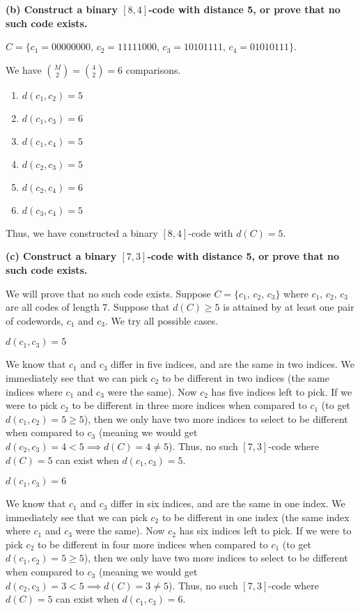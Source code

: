 \textbf{(b) Construct a binary $[8,4]$-code with distance 5, or prove that no such
code exists.}

$ C=\{
    c_1=00000000,\,
    c_2=11111000,\,
    c_3=10101111,\,
    c_4=01010111
    \} $.

We have $ \binom{M}{2}=\binom{4}{2}=6 $ comparisons.
\begin{enumerate}
    \item $ d(c_1,c_2)=5 $
    \item $ d(c_1,c_3)=6 $
    \item $ d(c_1,c_4)=5 $
    \item $ d(c_2,c_3)=5 $
    \item $ d(c_2,c_4)=6 $
    \item $ d(c_3,c_4)=5 $
\end{enumerate}

Thus, we have constructed a binary $ [8,4] $-code with $ d(C)=5 $.

\textbf{(c) Construct a binary $[7,3]$-code with distance 5, or prove that no such
code exists.}

We will prove that no such code exists. Suppose $ C=\{c_1,\,c_2,\,c_3\} $
where $ c_1,\,c_2,\,c_3 $ are all codes of length $ 7 $. Suppose
that $ d(C)\ge 5 $ is attained by at least one pair of codewords,
$ c_1 $ and $ c_3 $. We try all possible cases.

 $ d(c_1,c_3)=5 $

We know that $ c_1 $ and $ c_3 $ differ in five indices, and are the same
in two indices. We immediately see that we can pick $ c_2 $ to be different
in two indices (the same indices where $ c_1 $ and $ c_3 $ were the same).
Now $ c_2 $ has five indices left to pick.
If we were to pick $ c_2 $ to be different in three more indices when
compared to $ c_1 $ (to get $ d(c_1,c_2)=5\ge 5 $), then we only have two more
indices to select to be different when compared to $ c_3 $ (meaning we would get
$ d(c_2,c_3)=4<5\implies d(C)=4\neq 5 $). Thus, no such $ [7,3] $-code where
$ d(C)=5 $ can exist when $ d(c_1,c_3)=5 $.

 $ d(c_1,c_3)=6 $

We know that $ c_1 $ and $ c_3 $ differ in six indices, and are the same
in one index. We immediately see that we can pick $ c_2 $ to be different
in one index (the same index where $ c_1 $ and $ c_3 $ were the same).
Now $ c_2 $ has six indices left to pick.
If we were to pick $ c_2 $ to be different in four more indices when
compared to $ c_1 $ (to get $ d(c_1,c_2)=5\ge 5 $), then we only have two more
indices to select to be different when compared to $ c_3 $ (meaning we would get
$ d(c_2,c_3)=3<5 \implies d(C)=3\neq 5$). Thus, no such $ [7,3] $-code where
$ d(C)=5 $ can exist when $ d(c_1,c_3)=6 $.

